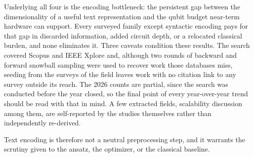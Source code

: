 \documentclass{ieeeaccess}
\begin{document}
Underlying all four is the encoding bottleneck: the persistent gap between the dimensionality of a useful text representation and the qubit budget near-term hardware can support. Every surveyed family except syntactic encoding pays for that gap in discarded information, added circuit depth, or a relocated classical burden, and none eliminates it. Three caveats condition these results. The search covered Scopus and IEEE Xplore and, although two rounds of backward and forward snowball sampling were used to recover work those databases miss, seeding from the surveys of the field leaves work with no citation link to any survey outside its reach. The 2026 counts are partial, since the search was conducted before the year closed, so the final point of every year-over-year trend should be read with that in mind. A few extracted fields, scalability discussion among them, are self-reported by the studies themselves rather than independently re-derived.

Text encoding is therefore not a neutral preprocessing step, and it warrants the scrutiny given to the ansatz, the optimizer, or the classical baseline.




\EOD
\end{document}

